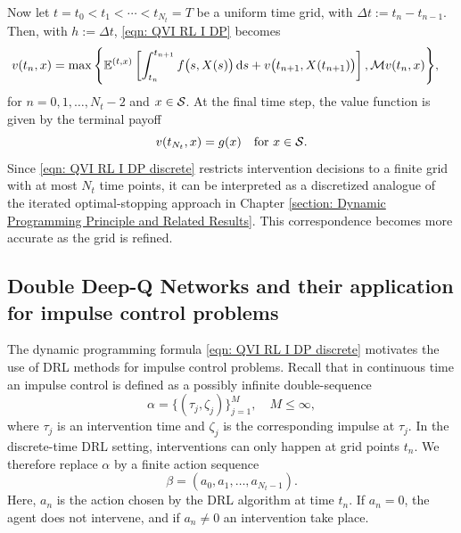 Now let $t=t_0 < t_1 < \cdots < t_{N_{t}} = T$ be a uniform time grid, with $\Delta t := t_n - t_{n-1}$. Then, with $h:=\Delta t$, \eqref{eqn: QVI RL I DP} becomes
\begin{align}
    v(t_n,x) = \max \Bigg\{ \mathbb{E}^{(t,x)} & \left[ \int_{t_n}^{t_{n+1}} f\big(s,X(s)\big) \,\mathrm{d} s + v\big(t_{n+1},X(t_{n+1}) \big) \right], \mathcal{M} v(t_n,x) \Bigg\}, \label{eqn: QVI RL I DP discrete}
\end{align}
for $n=0,1,\ldots,N_t-2$ and $x \in \mathcal{S}$. At the final time step, the value function is given by the terminal payoff
\begin{equation*}
    v(t_{N_t}, x) = g(x) \quad \text{for } x \in \mathcal{S}.
\end{equation*}
Since \eqref{eqn: QVI RL I DP discrete} restricts intervention decisions to a finite grid with at most $N_t$ time points, it can be interpreted as a discretized analogue of the iterated optimal-stopping approach in Chapter \ref{section: Dynamic Programming Principle and Related Results}. This correspondence becomes more accurate as the grid is refined. 

\subsection{Double Deep-Q Networks and their application for impulse control problems}
\label{section: Double Deep-Q Networks and their application to impulse control problems}
The dynamic programming formula \eqref{eqn: QVI RL I DP discrete} motivates the use of DRL methods for impulse control problems. Recall that in continuous time an impulse control is defined as a possibly infinite double-sequence
\begin{equation*}
    \alpha = \{(\tau_j, \zeta_j)\}_{j=1}^M, \quad M \leq \infty,
\end{equation*}
where $\tau_j$ is an intervention time and $\zeta_j$ is the corresponding impulse at $\tau_j$. In the discrete-time DRL setting, interventions can only happen at grid points $t_n$. We therefore replace $\alpha$ by a finite action sequence 
\begin{equation*}
    \beta = (a_0, a_1, \ldots, a_{N_{t}-1}).
\end{equation*}
Here, $a_n$ is the action chosen by the DRL algorithm at time $t_n$. If $a_n = 0$, the agent does not intervene, and if $a_n\neq 0$ an intervention take place. 

